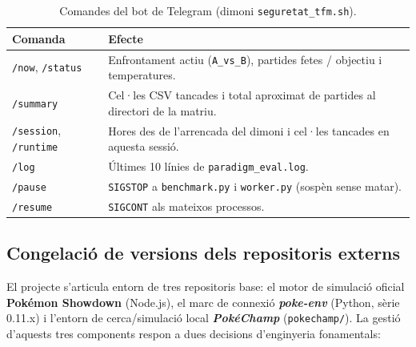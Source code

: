\begin{table}[htbp]
    \centering
    \caption{Comandes del bot de Telegram (dimoni \texttt{seguretat\_tfm.sh}).}
    \label{tab:telegram_commands_app}
    \small
    \renewcommand{\arraystretch}{1.15}
    \begin{tabularx}{\textwidth}{lX}
        \toprule
        \textbf{Comanda} & \textbf{Efecte} \\
        \midrule
        \texttt{/now}, \texttt{/status} & Enfrontament actiu (\texttt{A\_vs\_B}), partides fetes / objectiu i temperatures. \\
        \arrayrulecolor{gray!30}\hline\arrayrulecolor{black}
        \texttt{/summary} & Cel·les CSV tancades i total aproximat de partides al directori de la matriu. \\
        \arrayrulecolor{gray!30}\hline\arrayrulecolor{black}
        \texttt{/session}, \texttt{/runtime} & Hores des de l'arrencada del dimoni i cel·les tancades en aquesta sessió. \\
        \arrayrulecolor{gray!30}\hline\arrayrulecolor{black}
        \texttt{/log} & Últimes 10 línies de \texttt{paradigm\_eval.log}. \\
        \arrayrulecolor{gray!30}\hline\arrayrulecolor{black}
        \texttt{/pause} & \texttt{SIGSTOP} a \texttt{benchmark.py} i \texttt{worker.py} (sospèn sense matar). \\
        \arrayrulecolor{gray!30}\hline\arrayrulecolor{black}
        \texttt{/resume} & \texttt{SIGCONT} als mateixos processos. \\
        \bottomrule
    \end{tabularx}
\end{table}

\subsection{Congelació de versions dels repositoris externs}

El projecte s'articula entorn de tres repositoris base: el motor de simulació oficial \textbf{Pokémon Showdown} (Node.js), el marc de connexió \textbf{\textit{poke-env}} (Python, sèrie 0.11.x) i l'entorn de cerca/simulació local \textbf{\textit{PokéChamp}} (\texttt{pokechamp/}). La gestió d'aquests tres components respon a dues decisions d'enginyeria fonamentals:

